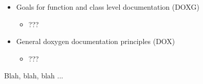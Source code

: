 \begin{itemize}
\item Goals for function and class level documentation (DOXG)

  \begin{itemize}

  \item ???

  \end{itemize}

\item General doxygen documentation principles (DOX)

  \begin{itemize}

  \item ???

  \end{itemize}

\end{itemize}


Blah, blah, blah ...
